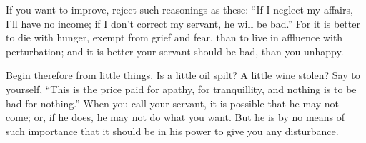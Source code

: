 If you want to improve, reject such reasonings as these: ``If I
neglect my affairs, I'll have no income; if I don't correct my servant,
he will be bad.'' For it is better to die with hunger, exempt from
grief and fear, than to live in affluence with perturbation; and it
is better your servant should be bad, than you unhappy. 

Begin therefore from little things. Is a little oil spilt? A little
wine stolen? Say to yourself, ``This is the price paid for apathy,
for tranquillity, and nothing is to be had for nothing.'' When you
call your servant, it is possible that he may not come; or, if he
does, he may not do what you want. But he is by no means of such importance
that it should be in his power to give you any disturbance.
